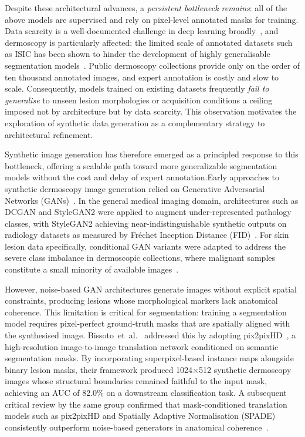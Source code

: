 Despite these architectural advances, a \emph{persistent bottleneck remains}: all of the above models are supervised and rely on pixel-level annotated masks for training.
Data scarcity is a well-documented challenge in deep learning broadly~\cite{bansal2022systematic}, and dermoscopy is particularly affected: the limited scale of annotated datasets such as ISIC has been shown to hinder the development of highly generalisable segmentation models~\cite{cassidy2022analysis}.
Public dermoscopy collections provide only on the order of ten thousand annotated images, and expert annotation is costly and slow to scale.
Consequently, models trained on existing datasets frequently \emph{fail to generalise} to unseen lesion morphologies or acquisition conditions a ceiling imposed not by architecture but by data scarcity.
This observation motivates the exploration of synthetic data generation as a complementary strategy to architectural refinement.

Synthetic image generation has therefore emerged as a principled
response to this bottleneck, offering a scalable path toward
more generalizable segmentation models without the cost and
delay of expert annotation.Early approaches to synthetic dermoscopy image generation relied on
Generative Adversarial Networks (GANs)~\cite{goodfellow2014generative}.
In the general medical imaging domain, architectures such as DCGAN and
StyleGAN2 were applied to augment under-represented pathology classes,
with StyleGAN2 achieving near-indistinguishable synthetic outputs on
radiology datasets as measured by Fréchet Inception Distance
(FID)~\cite{ktena2024generative}.
For skin lesion data specifically, conditional GAN variants were
adapted to address the severe class imbalance in dermoscopic
collections, where malignant samples constitute a small minority of
available images~\cite{cassidy2022analysis}.

However, noise-based GAN architectures generate images without
explicit spatial constraints, producing lesions whose morphological
markers lack anatomical coherence.
This limitation is critical for segmentation: training a segmentation
model requires pixel-perfect ground-truth masks that are spatially
aligned with the synthesised image.
Bissoto~et~al.~\cite{bissoto2018skin} addressed this by adopting
pix2pixHD~\cite{wang2018pix2pixHD}, a high-resolution
image-to-image translation network conditioned on semantic
segmentation masks.
By incorporating superpixel-based instance maps alongside binary
lesion masks, their framework produced 1024×512 synthetic dermoscopy
images whose structural boundaries remained faithful to the input
mask, achieving an AUC of 82.0\% on a downstream classification task.
A subsequent critical review by the same group confirmed that
mask-conditioned translation models such as pix2pixHD and
Spatially Adaptive Normalisation (SPADE) consistently outperform
noise-based generators in anatomical
coherence~\cite{bissoto2021gan}.

